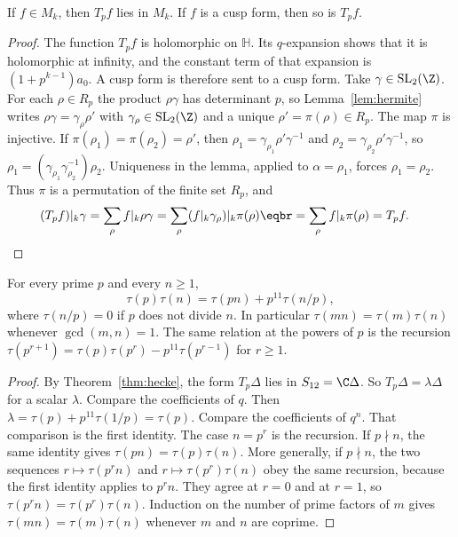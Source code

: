 \begin{theorem}[Hecke]\label{thm:hecke}
If $f\in M_k$, then $T_pf$ lies in $M_k$. If $f$ is a cusp form, then so is $T_pf$.
\end{theorem}

\begin{proof}
The function $T_pf$ is holomorphic on $\mathbb H$. Its $q$-expansion shows that it is holomorphic at infinity, and the constant term of that expansion is $(1+p^{k-1})a_0$. A cusp form is therefore sent to a cusp form. Take $\gamma\in\mathrm{SL}_2(\Z)$. For each $\rho\in R_p$ the product $\rho\gamma$ has determinant $p$, so Lemma~\ref{lem:hermite} writes $\rho\gamma=\gamma_\rho\rho'$ with $\gamma_\rho\in\mathrm{SL}_2(\Z)$ and a unique $\rho'=\pi(\rho)\in R_p$. The map $\pi$ is injective. If $\pi(\rho_1)=\pi(\rho_2)=\rho'$, then $\rho_1=\gamma_{\rho_1}\rho'\gamma^{-1}$ and $\rho_2=\gamma_{\rho_2}\rho'\gamma^{-1}$, so $\rho_1=(\gamma_{\rho_1}\gamma_{\rho_2}^{-1})\rho_2$. Uniqueness in the lemma, applied to $\alpha=\rho_1$, forces $\rho_1=\rho_2$. Thus $\pi$ is a permutation of the finite set $R_p$, and
\[
\begin{aligned}(T_pf)|_k\gamma&=\sum_\rho f|_k\rho\gamma=\sum_\rho(f|_k\gamma_\rho)|_k\pi(\rho)\eqbr=\sum_\rho f|_k\pi(\rho)=T_pf.\end{aligned}
\]
\end{proof}

\begin{theorem}[Mordell, 1917]\label{thm:mordell}
For every prime $p$ and every $n\ge1$,
\[
\tau(p)\tau(n)=\tau(pn)+p^{11}\tau(n/p),
\]
where $\tau(n/p)=0$ if $p$ does not divide $n$. In particular $\tau(mn)=\tau(m)\tau(n)$ whenever $\gcd(m,n)=1$. The same relation at the powers of $p$ is the recursion $\tau(p^{r+1})=\tau(p)\tau(p^r)-p^{11}\tau(p^{r-1})$ for $r\ge1$.
\end{theorem}

\begin{proof}
By Theorem~\ref{thm:hecke}, the form $T_p\Delta$ lies in $S_{12}=\C\Delta$. So $T_p\Delta=\lambda\Delta$ for a scalar $\lambda$. Compare the coefficients of $q$. Then $\lambda=\tau(p)+p^{11}\tau(1/p)=\tau(p)$. Compare the coefficients of $q^n$. That comparison is the first identity. The case $n=p^r$ is the recursion. If $p\nmid n$, the same identity gives $\tau(pn)=\tau(p)\tau(n)$. More generally, if $p\nmid n$, the two sequences $r\mapsto\tau(p^rn)$ and $r\mapsto\tau(p^r)\tau(n)$ obey the same recursion, because the first identity applies to $p^rn$. They agree at $r=0$ and at $r=1$, so $\tau(p^rn)=\tau(p^r)\tau(n)$. Induction on the number of prime factors of $m$ gives $\tau(mn)=\tau(m)\tau(n)$ whenever $m$ and $n$ are coprime.
\end{proof}

